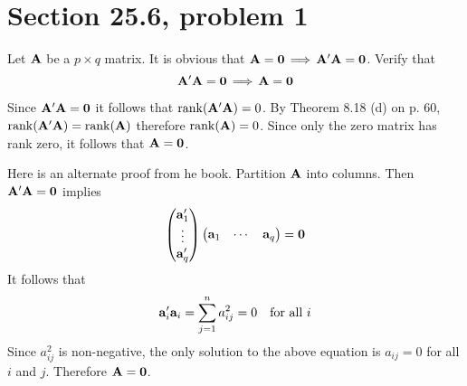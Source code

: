 \section{Section 25.6, problem 1}
Let $\bf A$ be a $p\times q$ matrix. It is obvious that
${\bf A}={\bf 0}\,\Longrightarrow\,{\bf A}'{\bf A}={\bf 0}$.
Verify that
$${\bf A}'{\bf A}={\bf 0}\,\Longrightarrow\,{\bf A}={\bf 0}$$

\bigskip
\noindent
Since ${\bf A}'{\bf A}={\bf 0}$ it follows that
$\mathop{\rm rank}({\bf A}'{\bf A})=0$.
By Theorem 8.18 (d) on p. 60,
$\mathop{\rm rank}({\bf A}'{\bf A})=\mathop{\rm rank}({\bf A})$
therefore $\mathop{\rm rank}({\bf A})=0$.
Since only the zero matrix has rank zero, it follows that
${\bf A}=\bf 0$.

\bigskip
\noindent
Here is an alternate proof from he book.
Partition $\bf A$ into columns. Then ${\bf A}'{\bf A}=\bf0$ implies
$$\left(\begin{matrix}
{\bf a}_1'\cr
\vdots\cr
{\bf a}_q'
\end{matrix}\right)\left(\begin{matrix}
{\bf a}_1 & \cdots & {\bf a}_q\end{matrix}\right)={\bf 0}
$$
It follows that
$${\bf a}_i'{\bf a}_i=\sum_{j=1}^n a_{ij}^2=0\quad\hbox{for all $i$}$$
Since $a_{ij}^2$ is non-negative, the only solution to the above
equation is $a_{ij}=0$ for all $i$ and $j$.
Therefore ${\bf A}=\bf 0$.
